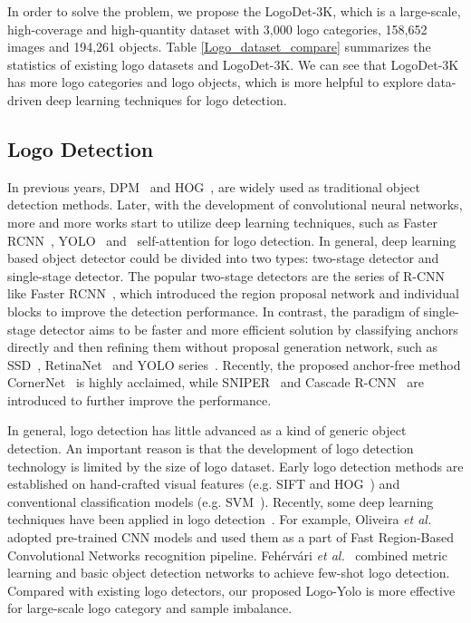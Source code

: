 \documentclass[journal]{IEEEtran}
\begin{document}
In order to solve the problem, we propose the LogoDet-3K, which is a large-scale, high-coverage and high-quantity dataset with 3,000 logo categories, 158,652 images and 194,261 objects.  Table \ref{Logo_dataset_compare} summarizes the statistics of existing logo datasets and LogoDet-3K. We can see that  LogoDet-3K has more logo categories and logo objects, which is more helpful to explore data-driven deep learning techniques for logo detection.

\subsection{Logo Detection}
In previous years, DPM~\cite{Pedro2010object} and HOG~\cite{Hoi2015LOGO}, are widely used as traditional object detection methods. Later, with the development of convolutional neural networks, more and more works start to utilize deep learning techniques, such as Faster RCNN~\cite{Ren2015},  YOLO~\cite{Joseph2018Yolov3} and~\cite{A2020Gao} self-attention for logo detection. In general, deep learning based object detector could be divided into two types: two-stage detector and single-stage detector. The popular two-stage detectors are the series of R-CNN like Faster RCNN~\cite{Ren2015}, which introduced the region proposal network and individual blocks to improve the detection performance. In contrast, the paradigm of single-stage detector aims to be faster and more efficient solution by classifying anchors directly and then refining them without proposal generation network, such as SSD~\cite{liu2016ssd}, RetinaNet~\cite{Tsung2017Focal} and YOLO series~\cite{Joseph2018Yolov3}. Recently, the proposed anchor-free method CornerNet~\cite{LawCornerNet2018} is highly acclaimed, while SNIPER~\cite{Singh2018SNIPER} and Cascade R-CNN~\cite{Cai2018CascadeR-CNN} are introduced to further improve the performance.

In general, logo detection has little advanced as a kind of generic object detection. An important reason is that the development of logo detection technology is limited by the size of logo dataset. Early logo detection methods are established on hand-crafted visual features (e.g. SIFT and HOG~\cite{Hoi2015LOGO}) and conventional classification models (e.g. SVM~\cite{Revaud2012Correlation}). Recently, some deep learning techniques have been applied in logo detection~\cite{Bianco2015Logo, Iandola2015DeepLogo, Kalantidis2011STL, Hang2020Scalable}. For example, Oliveira \emph{et al.}~\cite{Oliveira2016Automatic} adopted pre-trained CNN models and used them as a part of Fast Region-Based Convolutional Networks recognition pipeline. Feh{\'{e}}rv{\'{a}}ri \emph{et al.}~\cite{II2019Scalable} combined metric learning and basic object detection networks to achieve few-shot logo detection. Compared with existing logo detectors, our proposed Logo-Yolo is more effective for large-scale logo category and sample imbalance.
\end{document}
